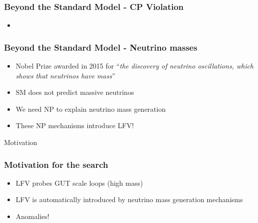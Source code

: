 \documentclass[xcolor=table]{beamer}
\begin{document}

\begin{frame}
\frametitle{Beyond the Standard Model - CP Violation}

\begin{itemize}
\item 
\end{itemize}

\end{frame}




\begin{frame}
\frametitle{Beyond the Standard Model - Neutrino masses}

\begin{itemize}
\item Nobel Prize awarded in 2015 for ``\emph{the discovery of neutrino oscillations, which shows that neutrinos have mass}''
\item SM does not predict massive neutrinos
\item We need NP to explain neutrino mass generation
\item These NP mechanisms introduce LFV!
\end{itemize}


\end{frame}





\begin{frame}

\begin{center}
{\Huge Motivation}
\end{center}

\end{frame}



\begin{frame}
\frametitle{Motivation for the search}

\begin{itemize}
\item LFV probes GUT scale loops (high mass)
\item LFV is automatically introduced by neutrino mass generation mechanisms
\item Anomalies!
\end{itemize}

\end{frame}

\end{document}
